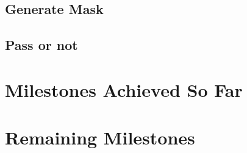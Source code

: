 \documentclass[conference,compsoc]{IEEEtran}
\begin{document}
\subsection{Generate Mask}

\subsection{Pass or not}

\section{Milestones Achieved So Far}

\section{Remaining Milestones}


% 
% 
\end{document}
